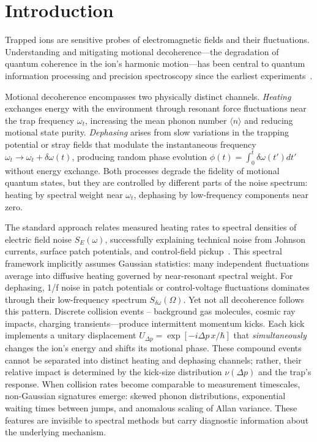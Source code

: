 \section{Introduction}

Trapped ions are sensitive probes of electromagnetic fields and their fluctuations. Understanding and mitigating motional decoherence—the degradation of quantum coherence in the ion's harmonic motion—has been central to quantum information processing and precision spectroscopy since the earliest experiments~\cite{Turchette2000,Wineland1998}. 

Motional decoherence encompasses two physically distinct channels. \emph{Heating} exchanges energy with the environment through resonant force fluctuations near the trap frequency $\omega_t$, increasing the mean phonon number $\langle n \rangle$ and reducing motional state purity. \emph{Dephasing} arises from slow variations in the trapping potential or stray fields that modulate the instantaneous frequency $\omega_t \to \omega_t + \delta\omega(t)$, producing random phase evolution $\phi(t) = \int_0^t \delta\omega(t') dt'$ without energy exchange. Both processes degrade the fidelity of motional quantum states, but they are controlled by different parts of the noise spectrum: heating by spectral weight near $\omega_t$, dephasing by low-frequency components near zero.

The standard approach relates measured heating rates to spectral densities of electric field noise $S_E(\omega)$, successfully explaining technical noise from Johnson currents, surface patch potentials, and control-field pickup~\cite{Brownnutt2015}. This spectral framework implicitly assumes Gaussian statistics: many independent fluctuations average into diffusive heating governed by near-resonant spectral weight. For dephasing, 1/f noise in patch potentials or control-voltage fluctuations dominates through their low-frequency spectrum $S_{\delta\omega}(\Omega)$.
Yet not all decoherence follows this pattern. Discrete collision events – background gas molecules, cosmic ray impacts, charging transients—produce intermittent momentum kicks. Each kick implements a unitary displacement $U_{\Delta p} = \exp[-i \Delta p \, x/\hbar]$ that \emph{simultaneously} changes the ion's energy and shifts its motional phase. These compound events cannot be separated into distinct heating and dephasing channels; rather, their relative impact is determined by the kick-size distribution $\nu(\Delta p)$ and the trap's response. When collision rates become comparable to measurement timescales, non-Gaussian signatures emerge: skewed phonon distributions, exponential waiting times between jumps, and anomalous scaling of Allan variance. These features are invisible to spectral methods but carry diagnostic information about the underlying mechanism.

